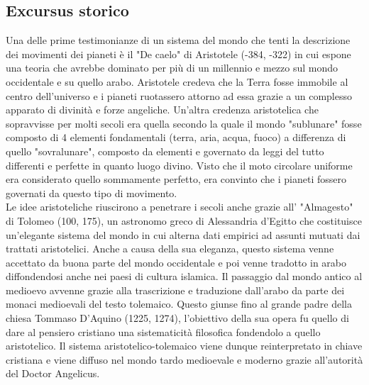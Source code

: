 \documentclass[10pt,a4paper]{article}
\begin{document}
\subsection*{Excursus storico}
Una delle prime testimonianze di un sistema del mondo che tenti la descrizione dei movimenti dei pianeti è il "De caelo" di Aristotele (-384, -322) in cui espone una teoria che avrebbe dominato per più di un millennio e mezzo sul mondo occidentale e su quello arabo. Aristotele credeva che la Terra fosse immobile al centro dell'universo e i pianeti ruotassero attorno ad essa grazie a un complesso apparato di divinità e forze angeliche. Un'altra credenza aristotelica che sopravvisse per molti secoli era quella secondo la quale il mondo "sublunare" fosse composto di 4 elementi fondamentali (terra, aria, acqua, fuoco) a differenza di quello "sovralunare", composto da elementi e governato da leggi del tutto differenti e perfette in quanto luogo divino. Visto che il moto circolare uniforme era considerato quello sommamente perfetto, era convinto che i pianeti fossero governati da questo tipo di movimento.\\
Le idee aristoteliche riuscirono a penetrare i secoli anche grazie all' "Almagesto" di Tolomeo (100, 175), un astronomo greco di Alessandria d'Egitto che costituisce un'elegante sistema del mondo in cui alterna dati empirici ad assunti mutuati dai trattati aristotelici. Anche a causa della sua eleganza, questo sistema venne accettato da buona parte del mondo occidentale e poi venne tradotto in arabo diffondendosi anche nei paesi di cultura islamica. Il passaggio dal mondo antico al medioevo avvenne grazie alla trascrizione e traduzione dall'arabo da parte dei monaci medioevali del testo tolemaico. Questo giunse fino al grande padre della chiesa Tommaso D'Aquino (1225, 1274), l'obiettivo della sua opera fu quello di dare al pensiero cristiano una sistematicità filosofica fondendolo a quello aristotelico. Il sistema aristotelico-tolemaico viene dunque reinterpretato in chiave cristiana e viene diffuso nel mondo tardo medioevale e moderno grazie all'autorità del Doctor Angelicus. \\
\end{document}
